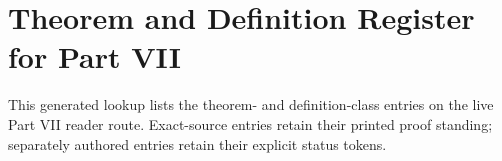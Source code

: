\section*{Theorem and Definition Register for Part VII}
\label{sec:p07-theorem-definition-register}

This generated lookup lists the theorem- and definition-class entries on the
live Part VII reader route.  Exact-source entries retain their printed proof
standing; separately authored entries retain their explicit status tokens.

